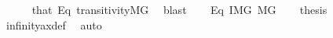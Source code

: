 \begin{isabellebody}
\ \ \ \ \isamarkupfalse%
\ that\ Eq{}\ transitivity{\isacharunderscore}{\kern0pt}MG\ \isamarkupfalse%
\ blast\isanewline
\ \ \isamarkupfalse%
\ Eq{}\ {\isacartoucheopen}I{\isasymin}M{\isacharbrackleft}{\kern0pt}G{\isacharbrackright}{\kern0pt}{\isacartoucheclose}\ {\isacartoucheopen}{}{\isasymin}M{\isacharbrackleft}{\kern0pt}G{\isacharbrackright}{\kern0pt}{\isacartoucheclose}\isanewline
\ \ \isamarkupfalse%
\ {\isacharquery}{\kern0pt}thesis\isanewline
\ \ \ \ \isamarkupfalse%
\ infinity{\isacharunderscore}{\kern0pt}ax{\isacharunderscore}{\kern0pt}def\ \isamarkupfalse%
\ auto\isanewline
{}\isamarkupfalse%
%
\endisatagproof
{\isafoldproof}%
%
\isadelimproof
\isanewline
%
\endisadelimproof
\isanewline
{}\isamarkupfalse%
\ \isanewline
%
\isadelimtheory
%
\endisadelimtheory
%
\isatagtheory
{}\isamarkupfalse%
%
\endisatagtheory
{\isafoldtheory}%
%
\isadelimtheory
%
\endisadelimtheory
%
\end{isabellebody}%
\endinput
